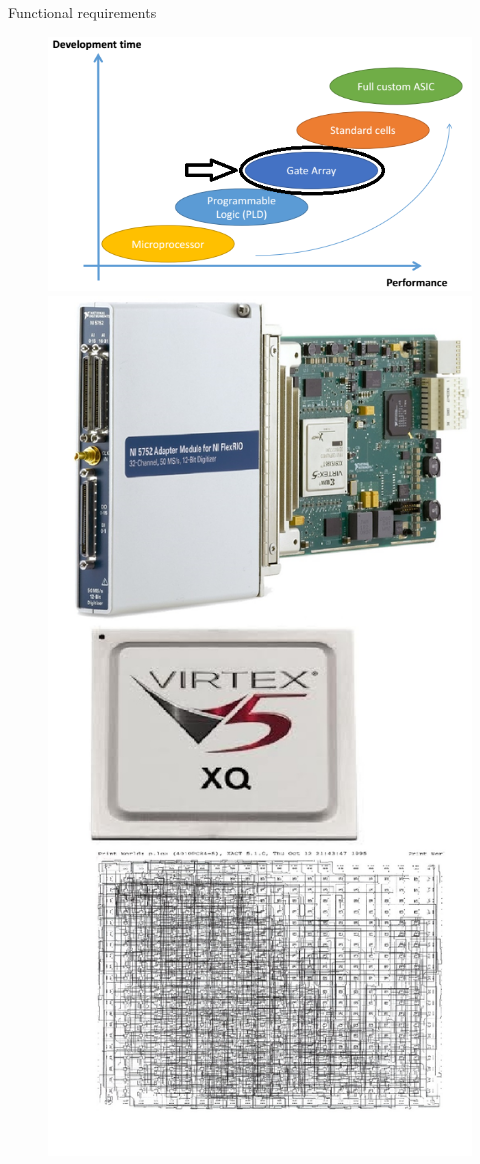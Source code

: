 \documentclass[t,12pt,english
\ifx\beamermode\undefined\else,\beamermode\fi
]{beamer}
\begin{document}
\begin{frame}{Functional requirements}
\begin{figure}[!htb]
\includegraphics[width=.75\textwidth]{1_1.png}
\endminipage
{}
\centering
\includegraphics[width=.65\textwidth]{3.png}
\endminipage
\end{figure}

\end{frame}
\end{document}
